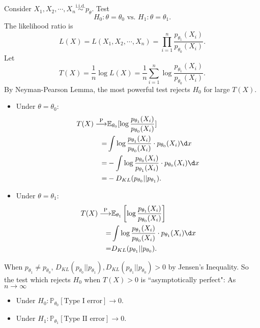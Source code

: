 \documentclass[a4paper]{article}
\begin{document}
\begin{eg}
	Consider $X_1,X_2,\cdots,X_n \stackrel{\text{i.i.d.}}{\sim} p_{\theta}$. Test
	\begin{equation*}
		H_0: \theta = \theta_0 \text{ vs. } H_1: \theta = \theta_1.
	\end{equation*}
	The likelihood ratio is
	\begin{equation*}
		L(X) = L(X_1,X_2,\cdots,X_n) = \prod\limits_{i=1}^n \frac{p_{\theta_1}(X_i)}{p_{\theta_0}(X_i)}.
	\end{equation*}
	Let
	\begin{equation*}
		T(X) = \frac{1}{n} \log L(X) = \frac{1}{n} \sum\limits_{i=1}^n \log \frac{p_{\theta_1}(X_i)}{p_{\theta_0}(X_i)}.
	\end{equation*}
	By Neyman-Pearson Lemma, the most powerful test rejects $H_0$ for large $T(X)$.
	\begin{itemize}[leftmargin=*]
		\item Under $\theta = \theta_0$:
		\begin{equation}
			\begin{aligned}
				T(X) \stackrel{\text{P}}{\longrightarrow} & \mathbb{E}_{\theta_0}[\log \frac{p_{\theta_1}(X_i)}{p_{\theta_0}(X_i)}] \\
				= & \int \log \frac{p_{\theta_1}(X_i)}{p_{\theta_0}(X_i)} \cdot p_{\theta_0}(X_i) \d x \\
				= & - \int \log \frac{p_{\theta_0}(X_i)}{p_{\theta_1}(X_i)} \cdot p_{\theta_0}(X_i) \d x \\
				= & - D_{KL}(p_{\theta_0}||p_{\theta_1}).
			\end{aligned}
		\end{equation}
		\item Under $\theta = \theta_1$:
		\begin{equation}
			\begin{aligned}
				T(X) \stackrel{\text{P}}{\longrightarrow} & \mathbb{E}_{\theta_1}\left[\log \frac{p_{\theta_1}(X_i)}{p_{\theta_0}(X_i)}\right] \\
				= & \int \log \frac{p_{\theta_1}(X_i)}{p_{\theta_0}(X_i)} \cdot p_{\theta_1}(X_i) \d x \\
				= & D_{KL}(p_{\theta_1}||p_{\theta_0}).
			\end{aligned}
		\end{equation}
	\end{itemize}
	\begin{note}
		When $p_{\theta_1} \neq p_{\theta_0}$, $D_{KL}(p_{\theta_0}||p_{\theta_1}),D_{KL}(p_{\theta_1}||p_{\theta_0}) > 0$ by Jensen's Inequality. So the test which rejects $H_0$ when $T(X) > 0$ is ``asymptotically perfect": As $n \to \infty$
		\begin{itemize}
			\item Under $H_0: \mathbb{P}_{\theta_0}[\text{Type I error}] \to 0$.
			\item Under $H_1: \mathbb{P}_{\theta_1}[\text{Type II error}] \to 0$.
		\end{itemize}
	\end{note}
\end{eg}
\end{document}

